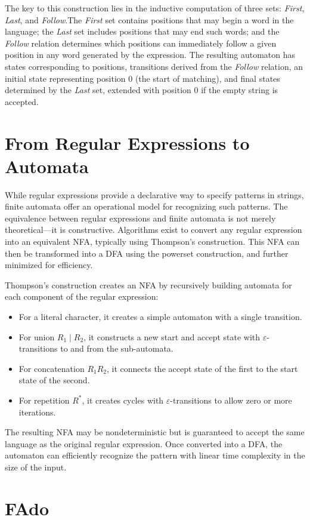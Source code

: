 The key to this construction lies in the inductive computation of three sets: \emph{First}, \emph{Last}, and \emph{Follow}.The \emph{First} set contains positions that may begin a word in the language; the \emph{Last} set includes positions that may end such words; and the \emph{Follow} relation determines which positions can immediately follow a given position in any word generated by the expression. The resulting automaton has states corresponding to positions, transitions derived from the \emph{Follow} relation, an initial state representing position 0 (the start of matching), and final states determined by the \emph{Last} set, extended with position 0 if the empty string is accepted. \cite{mesh-of-automata}

\section{From Regular Expressions to Automata}
While regular expressions provide a declarative way to specify patterns in strings, finite automata offer an operational model for recognizing such patterns.
The equivalence between regular expressions and finite automata is not merely theoretical---it is constructive. Algorithms exist to convert any regular expression into an equivalent NFA, typically using Thompson's construction. This NFA can then be transformed into a DFA using the powerset construction, and further minimized for efficiency.

Thompson's construction creates an NFA by recursively building automata for each component of the regular expression:
\begin{itemize}
    \item For a literal character, it creates a simple automaton with a single transition.
    \item For union $R_1 \mid R_2$, it constructs a new start and accept state with $\varepsilon$-transitions to and from the sub-automata.
    \item For concatenation $R_1 R_2$, it connects the accept state of the first to the start state of the second.
    \item For repetition $R^*$, it creates cycles with $\varepsilon$-transitions to allow zero or more iterations.
\end{itemize}

The resulting NFA may be nondeterministic but is guaranteed to accept the same language as the original regular expression. Once converted into a DFA, the automaton can efficiently recognize the pattern with linear time complexity in the size of the input.

\section{FAdo}
